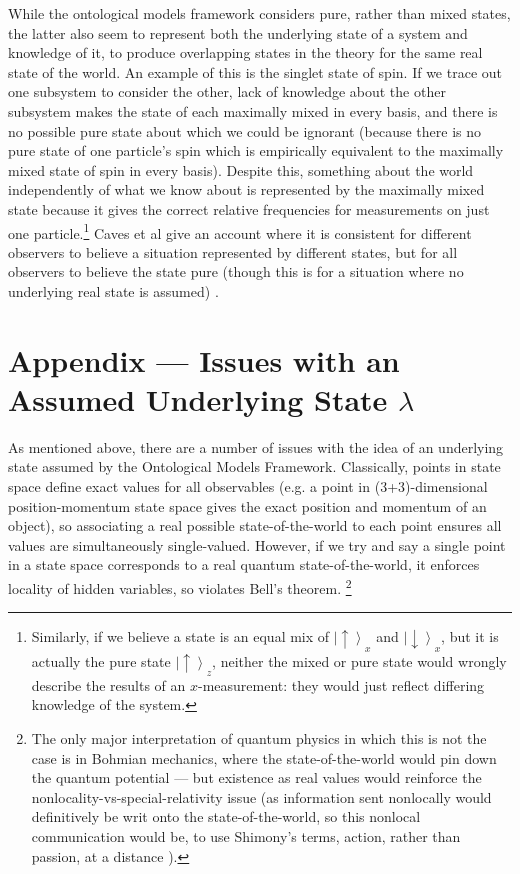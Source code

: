 \documentclass[superscriptaddress, floatfix,nofootinbib,12pt]{revtex4-2}
\newcommand{\ket}[1]{\left| #1 \right\rangle}
\newcommand{\upket}{\ket{\uparrow}}
\newcommand{\downket}{\ket{\downarrow}}
\begin{document}
While the ontological models framework considers pure, rather than mixed states, the latter also seem to represent both the underlying state of a system and knowledge of it, to produce overlapping states in the theory for the same real state of the world. An example of this is the singlet state of spin. If we trace out one subsystem to consider the other, lack of knowledge about the other subsystem makes the state of each maximally mixed in every basis, and there is no possible pure state about which we could be ignorant (because there is no pure state of one particle's spin which is empirically equivalent to the maximally mixed state of spin in every basis). Despite this, something about the world independently of what we know about is represented by the maximally mixed state because it gives the correct relative frequencies for measurements on just one particle.\footnote{Similarly, if we believe a state is an equal mix of $\upket_x$ and $\downket_x$, but it is actually the pure state $\upket_z$, neither the mixed or pure state would wrongly describe the results of an $x$-measurement: they would just reflect differing knowledge of the system.} Caves et al give an account where it is consistent for different observers to believe a situation represented by different states, but for all observers to believe the state pure (though this is for a situation where no underlying real state is assumed) \cite{Caves2002conditions}.

\section{Appendix --- Issues with an Assumed Underlying State \texorpdfstring{$\lambda$}{lambda}}
As mentioned above, there are a number of issues with the idea of an underlying state assumed by the Ontological Models Framework. Classically, points in state space define exact values for all observables (e.g. a point in (3+3)-dimensional position-momentum state space gives the exact position and momentum of an object), so associating a real possible state-of-the-world to each point ensures all values are simultaneously single-valued. However, if we try and say a single point in a state space corresponds to a real quantum state-of-the-world, it enforces locality of hidden variables, so violates Bell's theorem. \footnote{The only major interpretation of quantum physics in which this is not the case is in Bohmian mechanics, where the state-of-the-world would pin down the quantum potential --- but existence as real values would reinforce the nonlocality-vs-special-relativity issue (as information sent nonlocally would definitively be writ onto the state-of-the-world, so this nonlocal communication would be, to use Shimony's terms, action, rather than passion, at a distance \cite{Shimony1984Passion}).}
\end{document}
